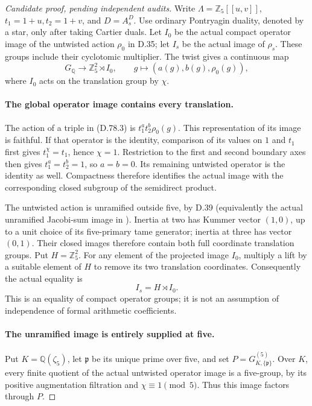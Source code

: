 \begin{proof}[Candidate proof, pending independent audits]
Write \(\Lambda=\mathbb Z_5[[u,v]]\), \(t_1=1+u,t_2=1+v\),
and \(D=A_s^D\). Use ordinary Pontryagin duality, denoted by a
star, only after taking Cartier duals.
Let \(I_0\) be the actual compact operator image of the untwisted
action \(\rho_0\) in D.35; let \(I_s\) be the actual image of
\(\rho_s\). These groups include their cyclotomic multiplier.
The twist gives a continuous map
\[
 G_{\mathbb Q}\longrightarrow\mathbb Z_5^2\rtimes I_0,
       \qquad g\longmapsto(a(g),b(g),\rho_0(g)),
                                                               \tag{D.78.3}
\]
where \(I_0\) acts on the translation group by \(\chi\).

\paragraph{The global operator image contains every translation.}
The action of a triple in (D.78.3) is
\(t_1^a t_2^b\rho_0(g)\). This representation of its image is
faithful. If that operator is the identity, comparison of its
values on \(1\) and \(t_1\) first gives \(t_1^\chi=t_1\), hence
\(\chi=1\). Restriction to the first and second boundary axes
then gives \(t_1^a=t_2^b=1\), so \(a=b=0\). Its remaining
untwisted operator is the identity as well. Compactness therefore
identifies the actual image with the corresponding closed
subgroup of the semidirect product.

The untwisted action is unramified outside five, by D.39
(equivalently the actual unramified Jacobi-sum image in
\cite[(1.1)--(1.2) and the following paragraph]{DE_NakamuraSakugawaWojtkowiak2017}).
Inertia at two has Kummer vector \((1,0)\), up to a unit
choice of its five-primary tame generator; inertia at three
has vector \((0,1)\). Their closed images therefore contain
both full coordinate translation groups. Put \(H=\mathbb Z_5^2\).
For any element of the projected image \(I_0\), multiply a lift
by a suitable element of \(H\) to remove its two translation
coordinates. Consequently the actual equality is
\[
                         I_s=H\rtimes I_0.              \tag{D.78.4}
\]
This is an equality of compact operator groups; it is not an
assumption of independence of formal arithmetic coefficients.

\paragraph{The unramified image is entirely supplied at five.}
Put \(K=\mathbb Q(\zeta_5)\), let \(\mathfrak p\) be its unique
prime over five, and set \(P=G_{K,\{\mathfrak p\}}^{(5)}\).
Over \(K\), every finite quotient of the actual untwisted
operator image is a five-group, by its positive augmentation
filtration and \(\chi\equiv1\pmod5\). Thus this image factors
through \(P\).


\end{proof}
